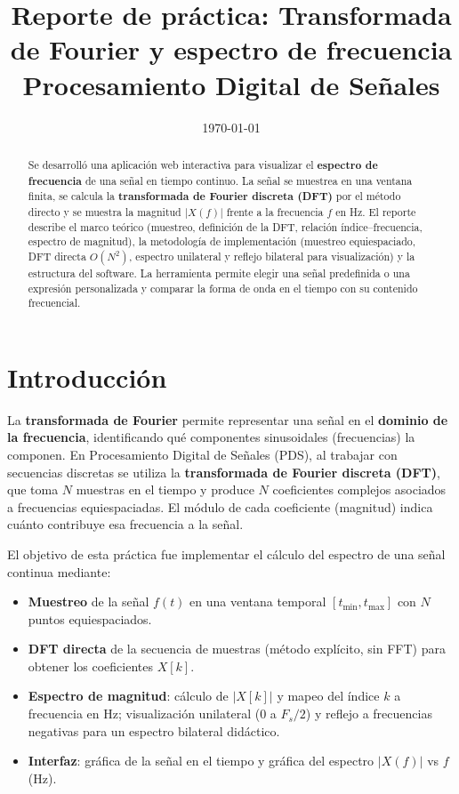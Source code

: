 \documentclass[12pt,a4paper]{article}
\title{\textbf{Reporte de práctica: Transformada de Fourier y espectro de frecuencia}\\[0.5em]
\large Procesamiento Digital de Señales}
\date{\today}
\begin{document}
\maketitle

\begin{abstract}
Se desarrolló una aplicación web interactiva para visualizar el \textbf{espectro de frecuencia} de una señal en tiempo continuo. La señal se muestrea en una ventana finita, se calcula la \textbf{transformada de Fourier discreta (DFT)} por el método directo y se muestra la magnitud \(|X(f)|\) frente a la frecuencia \(f\) en Hz. El reporte describe el marco teórico (muestreo, definición de la DFT, relación índice--frecuencia, espectro de magnitud), la metodología de implementación (muestreo equiespaciado, DFT directa \(O(N^2)\), espectro unilateral y reflejo bilateral para visualización) y la estructura del software. La herramienta permite elegir una señal predefinida o una expresión personalizada y comparar la forma de onda en el tiempo con su contenido frecuencial.
\end{abstract}

\tableofcontents
\newpage

\section{Introducción}

La \textbf{transformada de Fourier} permite representar una señal en el \textbf{dominio de la frecuencia}, identificando qué componentes sinusoidales (frecuencias) la componen. En Procesamiento Digital de Señales (PDS), al trabajar con secuencias discretas se utiliza la \textbf{transformada de Fourier discreta (DFT)}, que toma \(N\) muestras en el tiempo y produce \(N\) coeficientes complejos asociados a frecuencias equiespaciadas. El módulo de cada coeficiente (magnitud) indica cuánto contribuye esa frecuencia a la señal.

El objetivo de esta práctica fue implementar el cálculo del espectro de una señal continua mediante:
\begin{itemize}[noitemsep]
  \item \textbf{Muestreo} de la señal \(f(t)\) en una ventana temporal \([t_{\min}, t_{\max}]\) con \(N\) puntos equiespaciados.
  \item \textbf{DFT directa} de la secuencia de muestras (método explícito, sin FFT) para obtener los coeficientes \(X[k]\).
  \item \textbf{Espectro de magnitud}: cálculo de \(|X[k]|\) y mapeo del índice \(k\) a frecuencia en Hz; visualización unilateral (0 a \(F_s/2\)) y reflejo a frecuencias negativas para un espectro bilateral didáctico.
  \item \textbf{Interfaz}: gráfica de la señal en el tiempo y gráfica del espectro \(|X(f)|\) vs \(f\) (Hz).
\end{itemize}
\end{document}
